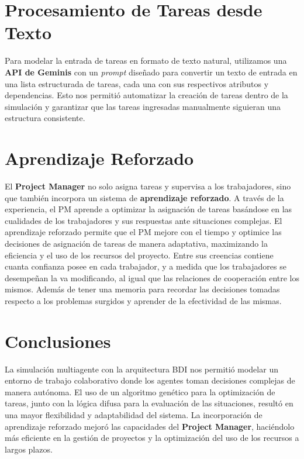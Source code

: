 \documentclass[a4paper, 12pt]{article}
\begin{document}
\section{Procesamiento de Tareas desde Texto}
Para modelar la entrada de tareas en formato de texto natural, utilizamos una \textbf{API de Geminis} con un \textit{prompt} diseñado para convertir un texto de entrada en una lista estructurada de tareas, cada una con sus respectivos atributos y dependencias. Esto nos permitió automatizar la creación de tareas dentro de la simulación y garantizar que las tareas ingresadas manualmente siguieran una estructura consistente.

\section{Aprendizaje Reforzado}
El \textbf{Project Manager} no solo asigna tareas y supervisa a los trabajadores, sino que también incorpora un sistema de \textbf{aprendizaje reforzado}. A través de la experiencia, el PM aprende a optimizar la asignación de tareas basándose en las cualidades de los trabajadores y sus respuestas ante situaciones complejas. El aprendizaje reforzado permite que el PM mejore con el tiempo y optimice las decisiones de asignación de tareas de manera adaptativa, maximizando la eficiencia y el uso de los recursos del proyecto. Entre sus creencias contiene cuanta confianza posee en cada trabajador, y a medida que los trabajadores se desempeñan la va modificando, al igual que las relaciones de cooperación entre los mismos. Además de tener una memoria para recordar las decisiones tomadas respecto a los problemas surgidos y aprender de la efectividad de las mismas.

\section{Conclusiones}
La simulación multiagente con la arquitectura BDI nos permitió modelar un entorno de trabajo colaborativo donde los agentes toman decisiones complejas de manera autónoma. El uso de un algoritmo genético para la optimización de tareas, junto con la lógica difusa para la evaluación de las situaciones, resultó en una mayor flexibilidad y adaptabilidad del sistema. La incorporación de aprendizaje reforzado mejoró las capacidades del \textbf{Project Manager}, haciéndolo más eficiente en la gestión de proyectos y la optimización del uso de los recursos a largos plazos.
\end{document}

